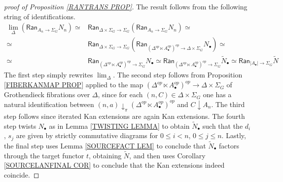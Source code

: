 \documentclass[a4paper,10pt]{article}%
\begin{document}
\begin{proof}[proof of Proposition \ref{RANTRANS PROP}]
The result follows from the following string of identifications.
\begin{align*}
	\lim_{\Delta}
	\left(
	\mathsf{Ran}_{A_n \to \Sigma_G}
	N_{n}
	\right)
	\simeq &
	\mathsf{Ran}_{\Delta \times \Sigma_G \to \Sigma_G}
	\left(
	\mathsf{Ran}_{A_n \to \Sigma_G}
	N_n
	\right) \simeq
\\
	\simeq &
	\mathsf{Ran}_{\Delta \times \Sigma_G \to \Sigma_G}
	\left(
	\mathsf{Ran}_{(\Delta^{op} \ltimes A^{op}_{\bullet})^{op} \to
	\Delta \times \Sigma_G}
	N_{\bullet}
	\right) \simeq
\\
	\simeq &
	\mathsf{Ran}_{
	(\Delta^{op} \ltimes A^{op}_{\bullet})^{op} \to
	\Sigma_G}
	N_{\bullet}
	\simeq 
	\mathsf{Ran}_{
	(\Delta^{op} \ltimes A^{op}_{\bullet})^{op} \to \Sigma_G}
	\tilde{N}_{\bullet}
	\simeq
	\mathsf{Ran}_{
	|A_{\bullet}| \to \Sigma_G}
	\tilde{N}
\end{align*}
The first step simply rewrites 
$\lim_{\Delta}$. 
The second step 
follows from Proposition \ref{FIBERKANMAP PROP} applied to the map 
$(\Delta^{op} \ltimes A^{op}_{\bullet})^{op} \to
\Delta \times \Sigma_G$
of Grothendieck fibrations over $\Delta$,
since for each
$(n,C) \in \Delta \times \Sigma_G$
one has a natural identification
between
$(n,a) \downarrow_{\pi} (\Delta^{op} \ltimes A^{op}_{\bullet})^{op}$
and
$C \downarrow A_n$.
The third step follows since iterated Kan extensions are again Kan extensions.
The fourth step twists $N_{\bullet}$
as in Lemma \ref{TWISTING LEMMA}
to obtain $\tilde{N}_{\bullet}$
such that the $d_i$, $s_j$ are given by strictly commutative diagrams for
$0\leq i < n$, $0\leq j \leq n$.
Lastly, the final step uses Lemma \ref{SOURCEFACT LEM}
to conclude that 
$\tilde{N}_{\bullet}$ factors through the
target functor $t$, obtaining $\tilde{N}$, 
and then uses 
Corollary \ref{SOURCELANFINAL COR}
to conclude that the Kan extensions indeed coincide.
\end{proof}







{}




\end{document}
